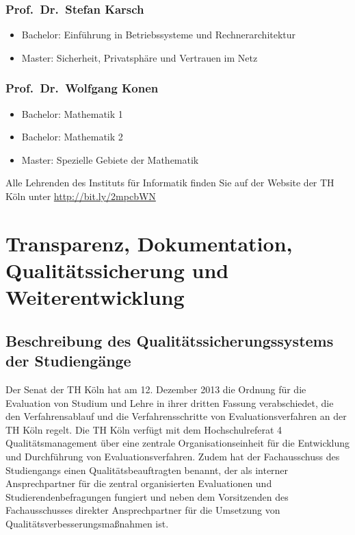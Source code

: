 \subsection{Prof.~Dr.~Stefan Karsch}\label{prof.dr.stefan-karsch}

\begin{itemize}
\tightlist
\item
  Bachelor: Einführung in Betriebssysteme und Rechnerarchitektur
\item
  Master: Sicherheit, Privatsphäre und Vertrauen im Netz
\end{itemize}

\subsection{Prof.~Dr.~Wolfgang Konen}\label{prof.dr.wolfgang-konen}

\begin{itemize}
\tightlist
\item
  Bachelor: Mathematik 1
\item
  Bachelor: Mathematik 2
\item
  Master: Spezielle Gebiete der Mathematik
\end{itemize}

Alle Lehrenden des Instituts für Informatik finden Sie auf der Website
der TH Köln unter \href{http://bit.ly/2mbFEYc}{http://bit.ly/2mpcbWN}

\chapter{Transparenz, Dokumentation, Qualitätssicherung und
Weiterentwicklung}\label{transparenz-dokumentation-qualituxe4tssicherung-und-weiterentwicklung}

\section{Beschreibung des Qualitätssicherungssystems der
Studiengänge}\label{beschreibung-des-qualituxe4tssicherungssystems-der-studienguxe4nge}

Der Senat der TH Köln hat am 12. Dezember 2013 die Ordnung für die
Evaluation von Studium und Lehre in ihrer dritten Fassung verabschiedet,
die den Verfahrensablauf und die Verfahrensschritte von
Evaluationsverfahren an der TH Köln regelt. Die TH Köln verfügt mit dem
Hochschulreferat 4 Qualitätsmanagement über eine zentrale
Organisationseinheit für die Entwicklung und Durchführung von
Evaluationsverfahren. Zudem hat der Fachausschuss des Studiengangs einen
Qualitätsbeauftragten benannt, der als interner Ansprechpartner für die
zentral organisierten Evaluationen und Studierendenbefragungen fungiert
und neben dem Vorsitzenden des Fachausschusses direkter Ansprechpartner
für die Umsetzung von Qualitätsverbesserungsmaßnahmen ist.

